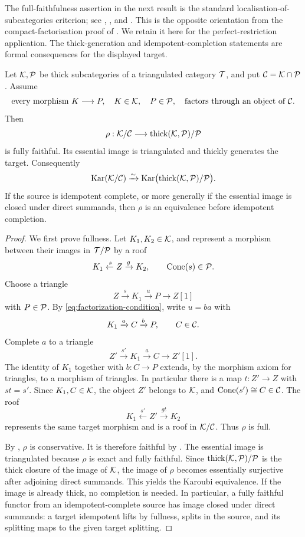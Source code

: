 The full-faithfulness assertion in the next result is the standard localisation-of-subcategories criterion; see \cite[the dual of Lemma~10.3]{Keller96}, \cite[Lemma~4.7.1(2)]{Krause10}, and \cite[Lemma~2.6(1)]{SunZhangZhang}.  This is the opposite orientation from the compact-factorisation proof of . We retain it here for the perfect-restriction application.  The thick-generation and idempotent-completion statements are formal consequences for the displayed target.

\begin{proposition}\label{thm:factorisation-comparison}
Let \(\mathcal K,\mathcal P\) be thick subcategories of a triangulated category \(\mathcal T\), and put \(\mathcal C=\mathcal K\cap\mathcal P\).  Assume
\begin{equation}\label{eq:factorization-condition}
 \text{every morphism }K\longrightarrow P,
 \quad K\in\mathcal K,
 \quad P\in\mathcal P,
 \quad\text{factors through an object of }\mathcal C.
\end{equation}
Then
\[
 \rho:\mathcal K/\mathcal C\longrightarrow\operatorname{thick}(\mathcal K,\mathcal P)/\mathcal P
\]
is fully faithful.  Its essential image is triangulated and thickly generates the target.  Consequently
\[
 \operatorname{Kar}(\mathcal K/\mathcal C)
 \xrightarrow{\sim}
 \operatorname{Kar}\bigl(\operatorname{thick}(\mathcal K,\mathcal P)/\mathcal P\bigr).
\]
If the source is idempotent complete, or more generally if the essential image is closed under direct summands, then \(\rho\) is an equivalence before idempotent completion.
\end{proposition}

\begin{proof}
We first prove fullness.  Let \(K_1,K_2\in\mathcal K\), and represent a morphism between their images in \(\mathcal T/\mathcal P\) by a roof
\[
 K_1\xleftarrow{s}Z\xrightarrow{g}K_2,
 \qquad \operatorname{Cone}(s)\in\mathcal P.
\]
Choose a triangle
\[
 Z\xrightarrow{s}K_1\xrightarrow{u}P\longrightarrow Z[1]
\]
with \(P\in\mathcal P\).  By \eqref{eq:factorization-condition}, write
\(u=ba\) with
\[
 K_1\xrightarrow{a}C\xrightarrow{b}P,
 \qquad C\in\mathcal C.
\]
Complete \(a\) to a triangle
\[
 Z'\xrightarrow{s'}K_1\xrightarrow{a}C\longrightarrow Z'[1].
\]
The identity of \(K_1\) together with \(b:C\to P\) extends, by the morphism axiom for triangles, to a morphism of triangles.  In particular there is a map \(t:Z'\to Z\) with
\(st=s'\).  Since \(K_1,C\in\mathcal K\), the object \(Z'\) belongs to \(\mathcal K\), and \(\operatorname{Cone}(s')\cong C\in\mathcal C\).  The roof
\[
 K_1\xleftarrow{s'}Z'\xrightarrow{gt}K_2
\]
represents the same target morphism and is a roof in \(\mathcal K/\mathcal C\).  Thus \(\rho\) is full.

By , \(\rho\) is conservative.  It is therefore faithful by .  The essential image is triangulated because \(\rho\) is exact and fully faithful.  Since
\(\operatorname{thick}(\mathcal K,\mathcal P)/\mathcal P\) is the thick closure of the image of \(\mathcal K\), the image of \(\rho\) becomes essentially surjective after adjoining direct summands.  This yields the Karoubi equivalence.  If the image is already thick, no completion is needed.  In particular, a fully faithful functor from an idempotent-complete source has image closed under direct summands: a target idempotent lifts by fullness, splits in the source, and its splitting maps to the given target splitting.
\end{proof}

